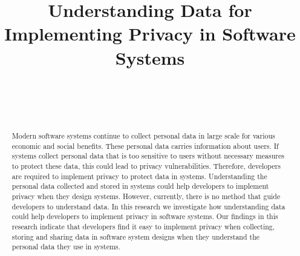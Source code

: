 \documentclass{sigchi}
\def\plaintitle{Understanding Data for Implementing Privacy in Software Systems}
\begin{document}
\title{\plaintitle}

\author{%
  \\
  \\
  \\
}

\maketitle

\begin{abstract}
Modern software systems continue to collect personal data in large scale for various economic and social benefits. These personal data carries information about users. If systems collect personal data that is too sensitive to users without necessary measures to protect these data, this could lead to privacy vulnerabilities. Therefore, developers are required to implement privacy to protect data in systems. Understanding the personal data collected and stored in systems could help developers to implement privacy when they design systems. However, currently, there is no method that guide developers to understand data. In this research we investigate how understanding data could help developers to implement privacy in software systems. Our findings in this research indicate that developers find it easy to implement privacy when collecting, storing and sharing data in software system designs when they understand the personal data they use in systems.
\end{abstract}

 

\end{document}
